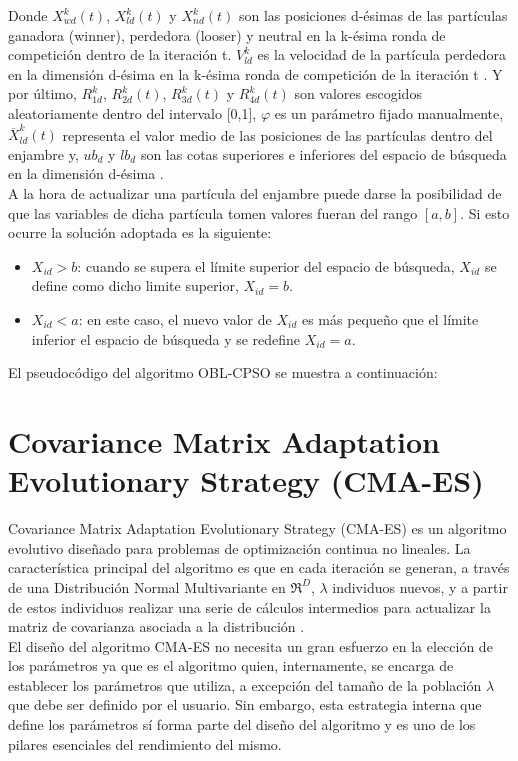 Donde $X^{k}_{wd}(t)$, $ X^{k}_{ld}(t)$ y $ X^{k}_{nd}(t)$ son las posiciones d-ésimas de las partículas ganadora (winner), perdedora (looser) y neutral en la k-ésima ronda de competición dentro de la iteración t. $V^{k}_{ld}$ es la velocidad de la partícula perdedora en la dimensión d-ésima en la k-ésima ronda de competición de la iteración t \cite{oblcpso}. Y por último, $R^{k}_{1d}$, $R^{k}_{2d}(t)$, $R^{k}_{3d}(t)$ y $R^{k}_{4d}(t)$ son valores escogidos aleatoriamente dentro del intervalo [0,1], $\varphi$ es un parámetro fijado manualmente, $\overline{X}^{k}_{ld}(t)$ representa el valor medio de las posiciones de las partículas dentro del enjambre y, $ub_{d}$ y $lb_{d}$ son las cotas superiores e inferiores del espacio de búsqueda en la dimensión d-ésima \cite{oblcpso}. \\

A la hora de actualizar una partícula del enjambre puede darse la posibilidad de que las variables de dicha partícula tomen valores fueran del rango $[a,b]$. Si esto ocurre la solución adoptada es la siguiente: 

\begin{itemize}
    \item \textbf{$X_{id} > b$}: cuando se supera el límite superior del espacio de búsqueda, $X_{id}$ se define como dicho limite superior, $X_{id} = b$.
    \item \textbf{$X_{id} < a$}: en este caso, el nuevo valor de $X_{id}$ es más pequeño que el límite inferior el espacio de búsqueda y se redefine $X_{id} = a$.
    \end{itemize}

El pseudocódigo del algoritmo OBL-CPSO se muestra a continuación: 


\clearpage


\section{Covariance Matrix Adaptation Evolutionary Strategy (CMA-ES)}
\label{sec:CMA}

Covariance Matrix Adaptation Evolutionary Strategy (CMA-ES) \cite{CMA1, CMA2, CMA} es un algoritmo evolutivo diseñado para problemas de optimización continua no lineales. 
La característica principal del algoritmo es que en cada iteración se generan, a través de una Distribución Normal Multivariante en $\Re^{D}$, $\lambda$ individuos nuevos, y a partir de estos individuos realizar una serie de cálculos intermedios para actualizar la matriz de covarianza asociada a la distribución \cite{CMA1}. \\  
El diseño del algoritmo CMA-ES no necesita un gran esfuerzo en la elección de los parámetros ya que es el algoritmo quien, internamente, se encarga de establecer los parámetros que utiliza, a excepción del tamaño de la población $\lambda$ que debe ser definido por el usuario. Sin embargo, esta estrategia interna que define los parámetros sí forma parte del diseño del algoritmo y es uno de los pilares esenciales del rendimiento del mismo. \\

